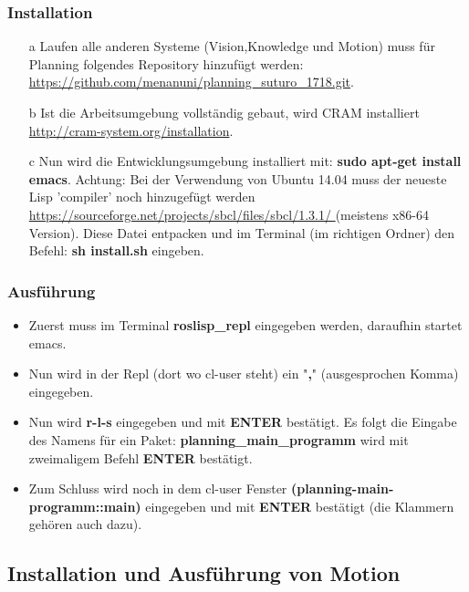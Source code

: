 \documentclass{suturo}
\begin{document}
\subsubsection{Installation}
\begin{itemize}


\item[a] Laufen alle anderen Systeme (Vision,Knowledge und Motion) muss für Planning folgendes Repository hinzufügt werden: \url{https://github.com/menanuni/planning_suturo_1718.git}. 

\item[b] Ist die Arbeitsumgebung vollständig gebaut, wird CRAM installiert \url{http://cram-system.org/installation}.

\item[c] Nun wird die Entwicklungsumgebung installiert mit: \textbf{sudo apt-get install emacs}. Achtung: Bei der Verwendung von Ubuntu 14.04 muss der neueste Lisp 'compiler' noch hinzugefügt werden \url{https://sourceforge.net/projects/sbcl/files/sbcl/1.3.1/
} (meistens x86-64 Version). Diese Datei entpacken und im Terminal (im richtigen Ordner) den Befehl: \textbf{sh install.sh} eingeben.
\end{itemize}

\subsubsection{Ausführung}
\begin{itemize}

\item Zuerst muss im Terminal \textbf{roslisp\_repl} eingegeben werden, daraufhin startet emacs. 

\item Nun wird in der Repl (dort wo cl-user steht) ein "\textbf{,}" (ausgesprochen Komma) eingegeben.

\item Nun wird \textbf{r-l-s} eingegeben und mit \textbf{ENTER} bestätigt. Es folgt die Eingabe des Namens für ein Paket: \textbf{planning\_main\_programm} wird mit zweimaligem Befehl \textbf{ENTER} bestätigt.

\item Zum Schluss wird noch in dem cl-user Fenster \textbf{(planning-main-programm::main)} eingegeben und mit \textbf{ENTER} bestätigt (die Klammern gehören auch dazu).
\end{itemize}


\subsection{Installation und Ausführung von Motion}
\end{document}
